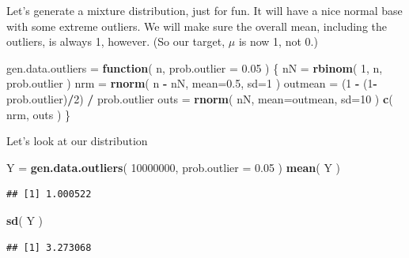 \documentclass[
]{book}
\newenvironment{Shaded}{\begin{snugshade}}{\end{snugshade}}
\newcommand{\AttributeTok}[1]{\textcolor[rgb]{0.13,0.29,0.53}{#1}}
\newcommand{\ControlFlowTok}[1]{\textcolor[rgb]{0.13,0.29,0.53}{\textbf{#1}}}
\newcommand{\DecValTok}[1]{\textcolor[rgb]{0.00,0.00,0.81}{#1}}
\newcommand{\FloatTok}[1]{\textcolor[rgb]{0.00,0.00,0.81}{#1}}
\newcommand{\FunctionTok}[1]{\textcolor[rgb]{0.13,0.29,0.53}{\textbf{#1}}}
\newcommand{\NormalTok}[1]{#1}
\newcommand{\OtherTok}[1]{\textcolor[rgb]{0.56,0.35,0.01}{#1}}
\newcommand{\SpecialCharTok}[1]{\textcolor[rgb]{0.81,0.36,0.00}{\textbf{#1}}}
\begin{document}
Let's generate a mixture distribution, just for fun. It will have a nice
normal base with some extreme outliers. We will make sure the overall mean,
including the outliers, is always 1, however. (So our target, \(\mu\) is now 1,
not 0.)

\begin{Shaded}
\begin{Highlighting}[]
\NormalTok{gen.data.outliers }\OtherTok{=} \ControlFlowTok{function}\NormalTok{( n, }\AttributeTok{prob.outlier =} \FloatTok{0.05}\NormalTok{ ) \{}
\NormalTok{    nN }\OtherTok{=} \FunctionTok{rbinom}\NormalTok{( }\DecValTok{1}\NormalTok{, n, prob.outlier )}
\NormalTok{    nrm }\OtherTok{=} \FunctionTok{rnorm}\NormalTok{( n }\SpecialCharTok{{-}}\NormalTok{ nN, }\AttributeTok{mean=}\FloatTok{0.5}\NormalTok{, }\AttributeTok{sd=}\DecValTok{1}\NormalTok{ )}
\NormalTok{    outmean }\OtherTok{=}\NormalTok{ (}\DecValTok{1} \SpecialCharTok{{-}}\NormalTok{ (}\DecValTok{1}\SpecialCharTok{{-}}\NormalTok{prob.outlier)}\SpecialCharTok{/}\DecValTok{2}\NormalTok{) }\SpecialCharTok{/}\NormalTok{ prob.outlier}
\NormalTok{    outs }\OtherTok{=} \FunctionTok{rnorm}\NormalTok{( nN, }\AttributeTok{mean=}\NormalTok{outmean, }\AttributeTok{sd=}\DecValTok{10}\NormalTok{ )}
    \FunctionTok{c}\NormalTok{( nrm, outs )}
\NormalTok{\}}
\end{Highlighting}
\end{Shaded}

Let's look at our distribution

\begin{Shaded}
\begin{Highlighting}[]
\NormalTok{Y }\OtherTok{=} \FunctionTok{gen.data.outliers}\NormalTok{( }\DecValTok{10000000}\NormalTok{, }\AttributeTok{prob.outlier =} \FloatTok{0.05}\NormalTok{ )}
\FunctionTok{mean}\NormalTok{( Y )}
\end{Highlighting}
\end{Shaded}

\begin{verbatim}
## [1] 1.000522
\end{verbatim}

\begin{Shaded}
\begin{Highlighting}[]
\FunctionTok{sd}\NormalTok{( Y )}
\end{Highlighting}
\end{Shaded}

\begin{verbatim}
## [1] 3.273068
\end{verbatim}
\end{document}
